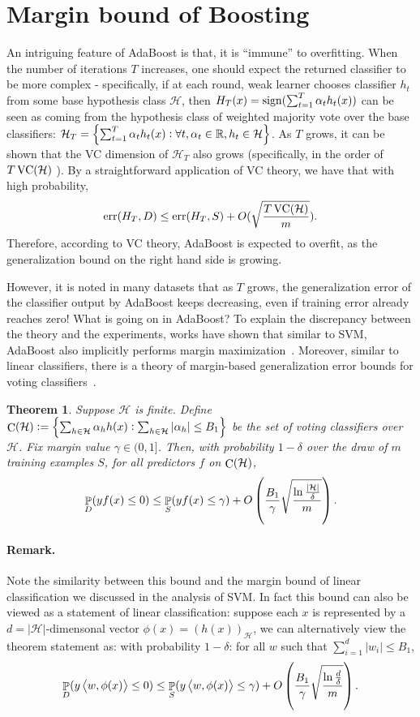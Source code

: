 \documentclass{article}
\newtheorem{theorem}{Theorem}
\DeclareMathOperator*{\err}{{\rm err}}
\DeclareMathOperator*{\sign}{{\rm sign}}
\DeclareMathOperator*{\C}{{\rm C}}
\DeclareMathOperator*{\VC}{{\rm VC}}
\DeclareMathOperator{\PP}{{\mathbb P}}
\newcommand{\RR}{\mathbb{R}} %
\newcommand{\Hcal}{\mathcal{H}}
\newcommand{\inner}[2]{\left\langle #1,#2 \right\rangle}
\begin{document}
\section{Margin bound of Boosting}
An intriguing feature of AdaBoost is that, it is ``immune'' to overfitting. When the number of iterations $T$ increases, one should expect the returned classifier to be more complex - specifically, if at each round, weak learner chooses classifier $h_t$ from some base hypothesis class $\Hcal$, then
$H_T(x) = \sign(\sum_{t=1}^T \alpha_t h_t(x))$ can be seen as coming from the hypothesis class of weighted majority vote over the base classifiers:
$\Hcal_T = \cbr{\sum_{t=1}^T \alpha_t h_t(x): \forall t, \alpha_t \in \RR, h_t \in \Hcal}$.
As $T$ grows, it can be shown that the VC dimension of $\Hcal_T$ also grows (specifically, in the order of $T \VC(\Hcal)$ ). By a straightforward application of VC theory, we have that with high probability,
\[
  \err(H_T, D) \leq \err(H_T, S) + O(\sqrt{\frac{T\VC(\Hcal)}{m}}).
\]
Therefore, according to VC theory, AdaBoost is expected to overfit, as the generalization bound on the right hand side is growing.

However, it is noted in many datasets that as $T$ grows, the generalization error of the classifier output by AdaBoost keeps decreasing, even if training error already reaches zero! What is going on in AdaBoost? To explain the discrepancy between the theory and the experiments, works have shown that similar to SVM, AdaBoost also implicitly performs margin maximization~\citep{schapire1998boosting}. Moreover, similar to linear classifiers, there is a theory of margin-based generalization error bounds for voting classifiers~\citep{schapire1998boosting,breiman1998arcing,koltchinskii2002empirical,wang2011refined}.

\begin{theorem}
Suppose $\Hcal$ is finite. Define $\C(\Hcal) := \cbr{\sum_{h \in \Hcal} \alpha_h h(x): \sum_{h \in \Hcal} |\alpha_h| \leq B_1}$ be the set of voting classifiers over $\Hcal$. Fix margin value $\gamma \in (0,1]$. Then, with probability $1-\delta$ over the draw of $m$ training examples $S$, for all predictors $f$ on $\C(\Hcal)$,
\[ \PP_D(y f(x) \leq 0) \leq \PP_S(y f(x) \leq \gamma) + O\del{\frac{B_1}{\gamma}\sqrt{\frac{\ln\frac{|\Hcal|}{\delta}}{m}}}. \]
\label{thm:margin-1-inf}
\end{theorem}
\paragraph{Remark.} Note the similarity between this bound and the margin bound of linear classification we discussed in the analysis of SVM. In fact this bound can also be viewed as a statement of linear classification: suppose each $x$ is represented by a $d = |\Hcal|$-dimensonal vector $\phi(x) = (h(x))_{\Hcal}$, we can alternatively view the theorem statement as: with probability $1-\delta$: for all $w$ such that $\sum_{i=1}^d |w_i| \leq B_1$,
\[ \PP_D(y\inner{w}{\phi(x)} \leq 0) \leq \PP_S(y\inner{w}{\phi(x)} \leq \gamma) + O\del{\frac{B_1}{\gamma}\sqrt{\frac{\ln\frac{d}{\delta}}{m}}}. \]
\end{document}
